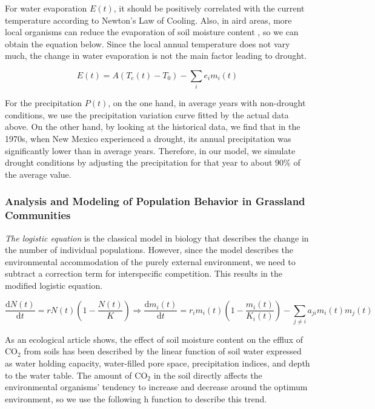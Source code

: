 \documentclass{mcmthesis}
\begin{document}
For water evaporation $E(t)$, it should be positively correlated with the current temperature according to Newton's Law of Cooling. Also, in aird areas, more local organisms can reduce the evaporation of soil moisture content \cite{7}, so we can obtain the equation below. Since the local annual temperature does not vary much, the change in water evaporation is not the main factor leading to drought.

\begin{equation}
E(t)=A\left(T_e(t)-T_0\right)-\sum_{i} e_i m_i(t)
\end{equation}

For the precipitation $P(t)$, on the one hand, in average years with non-drought conditions, we use the precipitation variation curve fitted by the actual data above. On the other hand, by looking at the historical data, we find that in the 1970s, when New Mexico experienced a drought, its annual precipitation was significantly lower than in average years. Therefore, in our model, we simulate drought conditions by adjusting the precipitation for that year to about $90 \%$ of the average value.


\subsubsection{Analysis and Modeling of Population Behavior in Grassland Communities}

\indent

\textit{The logistic equation} is the classical model in biology that describes the change in the number of individual populations. However, since the model describes the environmental accommodation of the purely external environment, we need to subtract a correction term for interspecific competition. This results in the modified logistic equation.

\begin{equation}
\frac{\mathrm{d} N(t)}{\mathrm{d} t}=r N(t)\left(1-\frac{N(t)}{K}\right) \Longrightarrow
\frac{\mathrm{d} m_i(t)}{\mathrm{d} t}=r_i m_i(t)\left(1-\frac{m_i(t)}{K_i(t)}\right)-\sum_{j \neq i} a_{j i} m_i(t) m_j(t)
\end{equation}

As an ecological article \cite{8} shows, the effect of soil moisture content on the efflux of CO$_2$ from soils has been described by the linear function of soil water expressed as water holding capacity, water-filled pore space, precipitation indices, and depth to the water table. The amount of CO$_2$ in the soil directly affects the environmental organisms' tendency to increase and decrease around the optimum environment, so we use the following h function to describe this trend.
\end{document}
